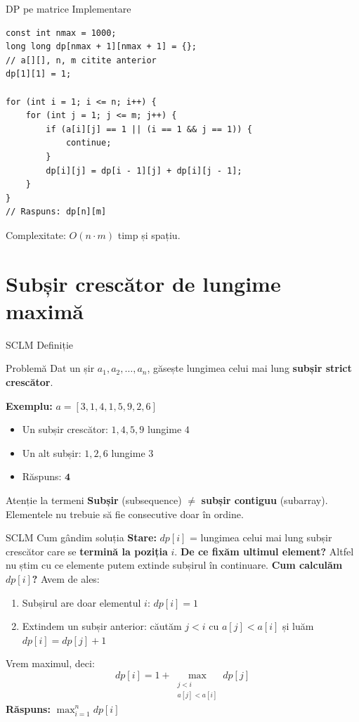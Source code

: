 \documentclass{beamer}
\begin{document}
\begin{frame}[fragile]{DP pe matrice \textemdash{} Implementare}
  \begin{lstlisting}
const int nmax = 1000;
long long dp[nmax + 1][nmax + 1] = {};
// a[][], n, m citite anterior
dp[1][1] = 1;

for (int i = 1; i <= n; i++) {
    for (int j = 1; j <= m; j++) {
        if (a[i][j] == 1 || (i == 1 && j == 1)) {
            continue;
        }
        dp[i][j] = dp[i - 1][j] + dp[i][j - 1];
    }
}
// Raspuns: dp[n][m]
  \end{lstlisting}
  Complexitate: $O(n \cdot m)$ timp și spațiu.
\end{frame}

\section{Subșir crescător de lungime maximă}

\begin{frame}{SCLM \textemdash{} Definiție}
  \begin{block}{Problemă}
    Dat un șir $a_1, a_2, \ldots, a_n$, găsește lungimea celui mai lung
    \textbf{subșir strict crescător}.
  \end{block}
  \smallskip
  \textbf{Exemplu:} $a = [3, 1, 4, 1, 5, 9, 2, 6]$
  \begin{itemize}
    \item Un subșir crescător: $1, 4, 5, 9$ \textemdash{} lungime $4$
    \item Un alt subșir: $1, 2, 6$ \textemdash{} lungime $3$
    \item Răspuns: $\mathbf{4}$
  \end{itemize}
  \smallskip
  \begin{alertblock}{Atenție la termeni}
    \textbf{Subșir} (subsequence) $\neq$ \textbf{subșir contiguu} (subarray).
    Elementele nu trebuie să fie consecutive \textemdash{} doar în ordine.
  \end{alertblock}
\end{frame}

\begin{frame}{SCLM \textemdash{} Cum gândim soluția}
  \textbf{Stare:} $dp[i]$ = lungimea celui mai lung subșir crescător
  care se \textbf{termină la poziția} $i$.
  \smallskip
  \textbf{De ce fixăm ultimul element?} Altfel nu știm cu ce elemente
  putem extinde subșirul în continuare.
  \smallskip
  \textbf{Cum calculăm $dp[i]$?} Avem de ales:
  \begin{enumerate}\itemsep2pt
    \item Subșirul are doar elementul $i$: $dp[i] = 1$
    \item Extindem un subșir anterior: căutăm $j < i$ cu $a[j] < a[i]$
          și luăm $dp[i] = dp[j] + 1$
  \end{enumerate}
  \smallskip
  Vrem maximul, deci:
  \[
    dp[i] = 1 + \max_{\substack{j < i \\ a[j] < a[i]}} dp[j]
  \]
  \textbf{Răspuns:} $\max_{i=1}^{n} dp[i]$
\end{frame}
\end{document}
